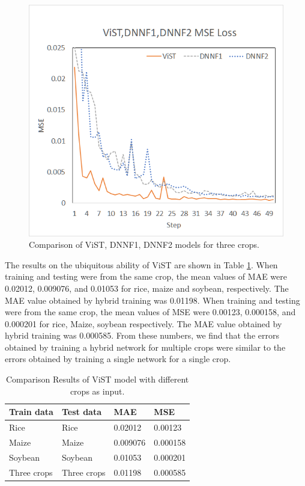 \documentclass[acmsmall,manuscript, screen, review]{acmart}
\begin{document}
\begin{figure}[htbp]
\begin{minipage}{0.49\linewidth}
    \includegraphics[width=\linewidth]{pic/generalization_vist_dnnf1_dnnf2_mse.png}
  \end{minipage}

  \caption{Comparison of ViST, DNNF1, DNNF2 models for three crops. \label{hybrid_result}}
\end{figure}

The results on the ubiquitous ability of ViST are shown in Table \ref{tab:ubiquitous}. When training and testing were from the same crop, the mean values of MAE were 0.02012, 0.009076, and 0.01053 for rice, maize and soybean, respectively. The MAE value obtained by hybrid training was 0.01198. When training and testing were from the same crop, the mean values of MSE were 0.00123, 0.000158, and 0.000201 for rice, Maize, soybean respectively. The MAE value obtained by hybrid training was 0.000585. From these numbers, we find that the errors obtained by training a hybrid network for multiple crops were similar to  the errors obtained by training a single network for a single crop. 


\begin{table}[htbp]
  \centering
  \caption{Comparison Results of ViST model with different crops as input.}
    \begin{tabular}{llll}
    \hline
    Train data & Test data & \multicolumn{1}{p{4.19em}}{MAE} & \multicolumn{1}{p{4.19em}}{MSE} \\
    \hline
    Rice  & Rice  & 0.02012 & 0.00123 \\
    Maize & Maize & 0.009076 & 0.000158 \\
    Soybean & Soybean & 0.01053 & 0.000201 \\
    Three crops & Three crops & 0.01198 & 0.000585 \\
    
    \hline
    \end{tabular}%
  \label{tab:ubiquitous}%
\end{table}%
\end{document}
